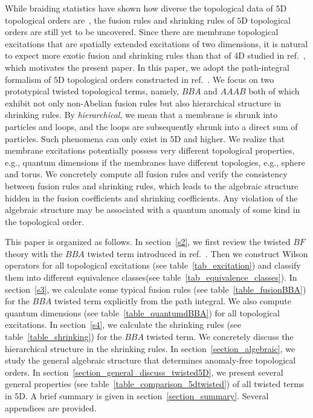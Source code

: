 \documentclass[11pt,nofootinbib,preprint]{revtex4-1}
\begin{document}
While braiding statistics have shown how diverse the topological data of $5$D topological orders are~\cite{Zhang:2021ycl}, the fusion rules and shrinking rules of $5$D topological orders are still yet to be uncovered. Since  there are  membrane topological excitations that are spatially extended excitations of two dimensions, it is natural to expect more exotic fusion and shrinking rules than that of $4$D studied in ref.~\cite{PhysRevB.107.165117}, which motivates the present paper. In this paper, we adopt the path-integral formalism of $5$D topological orders constructed in ref.~\cite{Zhang:2021ycl}. We focus   on two prototypical twisted topological terms, namely, $BBA$ and $AAAB$ both of which exhibit not only non-Abelian fusion rules but also   hierarchical structure in shrinking rules.  By \textit{hierarchical}, we mean that a membrane is  shrunk into  particles and loops, and  the loops are subsequently shrunk into a direct sum of particles. Such phenomena can only exist in $5$D and higher.  We  realize that membrane excitations potentially possess very different topological properties, e.g., quantum dimensions if the membranes have different topologies, e.g., sphere and torus. We concretely compute all fusion rules and verify the consistency between fusion rules and shrinking rules, which leads to the algebraic structure hidden in the fusion coefficients and shrinking coefficients. Any violation of the algebraic structure may be associated with a quantum anomaly of some kind in the topological order. 
   
     This paper is organized as follows. In section~\ref{s2}, we first review the twisted $BF$ theory with the $BBA$ twisted term introduced in ref.~\cite{Zhang:2021ycl}. Then we construct Wilson operators for all topological excitations (see table~\ref{tab_excitation}) and classify them into different equivalence classes(see table~\ref{tab_equivalence_classes}). In section~\ref{s3}, we calculate some typical fusion rules (see table~\ref{table_fusionBBA}) for the $BBA$ twisted term explicitly from the path integral. We also compute quantum dimensions (see table~\ref{table_quantumdBBA}) for all topological excitations. In section~\ref{s4}, we calculate the shrinking rules (see table~\ref{table_shrinking}) for the $BBA$ twisted term. We concretely discuss the hierarchical structure in the shrinking rules. In section~\ref{section_algebraic}, we study the general algebraic structure that determines anomaly-free topological orders. In section~\ref{section_general_discuss_twisted5D}, we present several general properties (see table~\ref{table_comparison_5dtwisted}) of all twisted terms in $5$D. 
A brief summary is given in section~\ref{section_summary}. Several appendices are provided.
\end{document}
